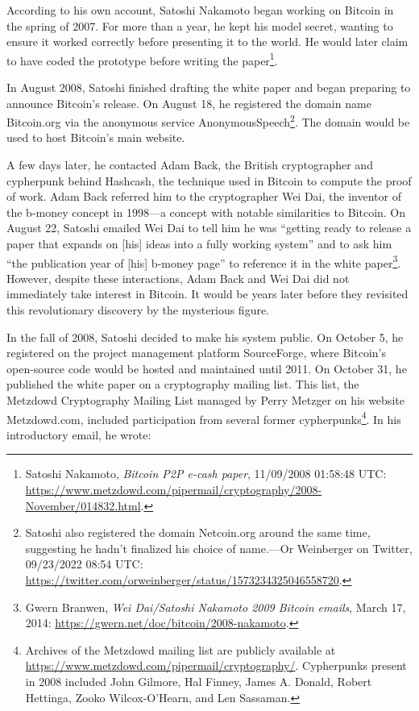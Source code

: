 \documentclass[
  a5paper,
  smalldemyvopaper,10pt,twoside,onecolumn,openright,extrafontsizes,hidelinks]{memoir}
\begin{document}
According to his own account, Satoshi Nakamoto began working on Bitcoin
in the spring of 2007. For more than a year, he kept his model secret,
wanting to ensure it worked correctly before presenting it to the world.
He would later claim to have coded the prototype before writing the
paper\footnote{Satoshi Nakamoto, \emph{Bitcoin P2P e-cash paper},
  11/09/2008 01:58:48 UTC:
  \url{https://www.metzdowd.com/pipermail/cryptography/2008-November/014832.html}.}.

In August 2008, Satoshi finished drafting the white paper and began
preparing to announce Bitcoin's release. On August 18, he registered the
domain name Bitcoin.org via the anonymous service
AnonymousSpeech\footnote{Satoshi also registered the domain Netcoin.org
  around the same time, suggesting he hadn't finalized his choice of
  name.---Or Weinberger on Twitter, 09/23/2022 08:54 UTC:
  \url{https://twitter.com/orweinberger/status/1573234325046558720}.}.
The domain would be used to host Bitcoin's main website.

A few days later, he contacted Adam Back, the British cryptographer and
cypherpunk behind Hashcash, the technique used in Bitcoin to compute the
proof of work. Adam Back referred him to the cryptographer Wei Dai, the
inventor of the b-money concept in 1998---a concept with notable
similarities to Bitcoin. On August 22, Satoshi emailed Wei Dai to tell
him he was ``getting ready to release a paper that expands on {[}his{]}
ideas into a fully working system'' and to ask him ``the publication
year of {[}his{]} b-money page'' to reference it in the white
paper\footnote{Gwern Branwen, \emph{Wei Dai/Satoshi Nakamoto 2009
  Bitcoin emails}, March 17, 2014:
  \url{https://gwern.net/doc/bitcoin/2008-nakamoto}.}. However, despite
these interactions, Adam Back and Wei Dai did not immediately take
interest in Bitcoin. It would be years later before they revisited this
revolutionary discovery by the mysterious figure.

In the fall of 2008, Satoshi decided to make his system public. On
October 5, he registered on the project management platform SourceForge,
where Bitcoin's open-source code would be hosted and maintained until
2011. On October 31, he published the white paper on a cryptography
mailing list. This list, the Metzdowd Cryptography Mailing List managed
by Perry Metzger on his website Metzdowd.com, included participation
from several former cypherpunks\footnote{Archives of the Metzdowd
  mailing list are publicly available at
  \url{https://www.metzdowd.com/pipermail/cryptography/}. Cypherpunks
  present in 2008 included John Gilmore, Hal Finney, James A. Donald,
  Robert Hettinga, Zooko Wilcox-O'Hearn, and Len Sassaman.}. In his
introductory email, he wrote:
\end{document}

